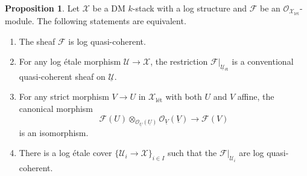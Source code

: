 \documentclass[11pt]{amsart}
\theoremstyle{definition}
\theoremstyle{definition}
\newtheorem{proposition}[theorem]{Proposition}
\newcommand{\cF}{\mathcal{F}}
\newcommand{\cU}{\mathcal{U}}
\newcommand{\ul}[1]{\underline{#1}}
\newcommand{\cal}{\mathcal}
\def\cF{{\cal F}}
\def\cU{{\cal U}}
\begin{document}
\begin{proposition}\label{Prop-on-quasi-coherent-sheaves}
Let $\mathcal{X}$ be a DM $k$-stack with a log structure and $\mathcal{F}$ be an $\mathcal{O}_{\mathcal{X}_{\text{l\'et}}}$-module. The following statements are equivalent.
\begin{enumerate}
    \item \label{item-1-prop-quasi-coherent}
    The sheaf $\mathcal{F}$ is log quasi-coherent.
    \item\label{item-2-prop-quasi-coherent} For any log \'etale morphism $\mathcal{U}\rightarrow \mathcal{X}$, the restriction $\mathcal{F}|_{\ul{\mathcal{U}}{}_{\text{\'et}}}$ is a conventional quasi-coherent sheaf on $\underline{\mathcal{U}}$.
    \item\label{item-3-prop-quasi-coherent} For any strict morphism $V\rightarrow U$ in $\mathcal{X}_{\text{l\'et}}$ with both $U$ and $V$ affine, the canonical morphism
    $$\mathcal{F}(U)\otimes_{\mathcal{O}_{\ul{U}}(\ul{U})}\mathcal{O}_{\ul{V}}(\ul{V})\longrightarrow \mathcal{F}(V)$$
    is an isomorphism.
    \item\label{item-4-prop-quasi-coherent} There is a log \'etale cover $\{\mathcal{U}_i\rightarrow \mathcal{X}\}_{i\in I}$ such that the $\cF|_{\cU_i}$ are log quasi-coherent.
\end{enumerate}
\end{proposition}
\end{document}

